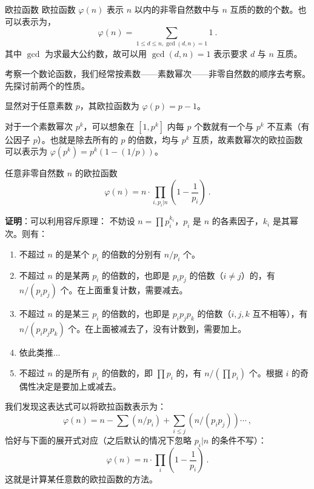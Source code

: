 

\begin{definition}{欧拉函数}
欧拉函数 $\varphi(n)$ 表示 $n$ 以内的非零自然数中与 $n$ 互质的数的个数。也可以表示为，
$$\varphi(n) = \sum_{1 \le d \le n, \gcd(d, n) = 1} 1  ~.$$
其中 $\gcd$ 为求最大公约数，故可以用 $\gcd(d, n)=1$ 表示要求 $d$ 与 $n$ 互质。
\end{definition}



考察一个数论函数，我们经常按素数——素数幂次——非零自然数的顺序去考察。先探讨前两个的性质。

显然对于任意素数 $p$，其欧拉函数为 $\varphi(p) = p-1$。

对于一个素数幂次 $p^k$，可以想象在 $[1, p^k]$ 内每 $p$ 个数就有一个与 $p^k$ 不互素（有公因子 $p$）。也就是除去所有的 $p$ 的倍数，均与 $p^k$ 互质，故素数幂次的欧拉函数可以表示为 $\varphi(p^k) = p^k \left(1 - (1/p)\right)$。

\begin{corollary}{任意非零自然数 $n$ 的欧拉函数}\label{cor_EulFun_1}
\begin{equation}
\varphi(n) = n \cdot \prod_{i, p_i | n} \left( 1 - \frac1{p_i}\right)~.
\end{equation}
\end{corollary}
\textbf{证明}：可以利用容斥原理：
不妨设 $n = \prod {p_i^{k_i}}$，$p_i$ 是 $n$ 的各素因子，$k_i$ 是其幂次。则有：
\begin{enumerate}
\item 不超过 $n$ 的是某个 $p_i$ 的倍数的分别有 $n/p_i$ 个。
\item 不超过 $n$ 的是某两 $p_i$ 的倍数的，也即是 $p_i p_j$ 的倍数（$i \neq j$）的，有 $n/(p_i p_j)$ 个。在上面重复计数，需要减去。
\item 不超过 $n$ 的是某三 $p_i$ 的倍数的，也即是 $p_i p_j p_k$ 的倍数（$i, j, k$ 互不相等），有 $n/(p_i p_j p_k)$ 个。在上面被减去了，没有计数到，需要加上。
\item 依此类推...
\item 不超过 $n$ 的是所有 $p_i$ 的倍数的，即 $\prod p_i$ 的，有 $n/(\prod p_i)$ 个。根据 $i$ 的奇偶性决定是要加上或减去。
\end{enumerate}
我们发现这表达式可以将欧拉函数表示为：
$$\varphi(n) = n - \sum(n/p_i) + \sum_{i\le j} (n/(p_i p_j)) \cdots  ~, $$
恰好与下面的展开式对应（之后默认的情况下忽略 $p_i | n$ 的条件不写）：
$$\varphi(n) = n \cdot \prod_i \left( 1 - \frac1{p_i}\right)~.$$
这就是计算某任意数的欧拉函数的方法。



